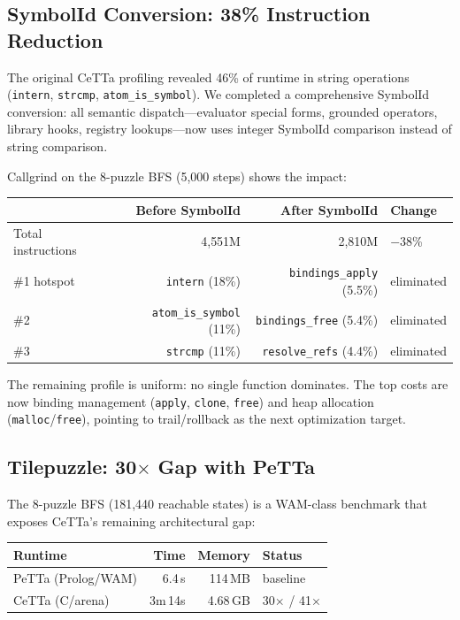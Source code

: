 \documentclass[11pt]{article}
\newcommand{\code}[1]{\texttt{#1}}
\newcommand{\PeTTa}{\textup{PeTTa}}
\newcommand{\CeTTa}{\textup{CeTTa}}
\begin{document}
\subsection{SymbolId Conversion: 38\% Instruction Reduction}

The original \CeTTa{} profiling revealed 46\% of runtime in string
operations (\code{intern}, \code{strcmp}, \code{atom\_is\_symbol}).
We completed a comprehensive SymbolId conversion: all semantic
dispatch---evaluator special forms, grounded operators, library hooks,
registry lookups---now uses integer SymbolId comparison instead of
string comparison.

Callgrind on the 8-puzzle BFS (5{,}000 steps) shows the impact:

\begin{center}
\begin{tabular}{lrrl}
\toprule
& Before SymbolId & After SymbolId & Change \\
\midrule
Total instructions & 4{,}551M & 2{,}810M & $-$38\% \\
\#1 hotspot & \code{intern} (18\%) & \code{bindings\_apply} (5.5\%) & eliminated \\
\#2 & \code{atom\_is\_symbol} (11\%) & \code{bindings\_free} (5.4\%) & eliminated \\
\#3 & \code{strcmp} (11\%) & \code{resolve\_refs} (4.4\%) & eliminated \\
\bottomrule
\end{tabular}
\end{center}

The remaining profile is uniform: no single function dominates.
The top costs are now binding management (\code{apply}, \code{clone},
\code{free}) and heap allocation (\code{malloc}/\code{free}), pointing
to trail/rollback as the next optimization target.

\subsection{Tilepuzzle: 30$\times$ Gap with PeTTa}

The 8-puzzle BFS (181{,}440 reachable states) is a WAM-class benchmark
that exposes \CeTTa{}'s remaining architectural gap:

\begin{center}
\begin{tabular}{lrrl}
\toprule
Runtime & Time & Memory & Status \\
\midrule
\PeTTa{} (Prolog/WAM) & 6.4\,s & 114\,MB & baseline \\
\CeTTa{} (C/arena) & 3m\,14s & 4.68\,GB & 30$\times$ / 41$\times$ \\
\bottomrule
\end{tabular}
\end{center}
\end{document}
